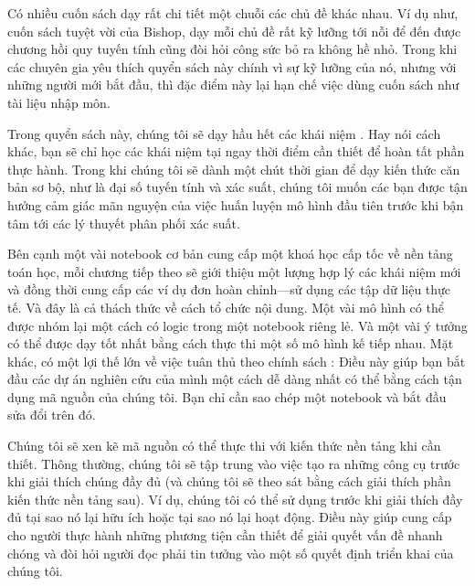 \documentclass[letterpaper,11pt,english]{sphinxmanual}
\begin{document}
Có nhiều cuốn sách dạy rất chi tiết một chuỗi các chủ đề khác nhau. Ví
dụ như, cuốn sách tuyệt vời  của Bishop, dạy mỗi
chủ đề rất kỹ lưỡng tới nỗi để đến được chương hồi quy tuyến tính cũng
đòi hỏi công sức bỏ ra không hề nhỏ. Trong khi các chuyên gia yêu thích
quyển sách này chính vì sự kỹ lưỡng của nó, nhưng với những người mới
bắt đầu, thì đặc điểm này lại hạn chế việc dùng cuốn sách như tài liệu
nhập môn.



Trong quyển sách này, chúng tôi sẽ dạy hầu hết các khái niệm . Hay nói cách khác, bạn sẽ chỉ học các khái niệm tại ngay thời điểm
cần thiết để hoàn tất phần thực hành. Trong khi chúng tôi sẽ dành một
chút thời gian để dạy kiến thức căn bản sơ bộ, như là đại số tuyến tính
và xác suất, chúng tôi muốn các bạn được tận hưởng cảm giác mãn nguyện
của việc huấn luyện mô hình đầu tiên trước khi bận tâm tới các lý thuyết
phân phối xác suất.



Bên cạnh một vài notebook cơ bản cung cấp một khoá học cấp tốc về nền
tảng toán học, mỗi chương tiếp theo sẽ giới thiệu một lượng hợp lý các
khái niệm mới và đồng thời cung cấp các ví dụ đơn hoàn chỉnh—sử dụng các
tập dữ liệu thực tế. Và đây là cả thách thức về cách tổ chức nội dung.
Một vài mô hình có thể được nhóm lại một cách có logic trong một
notebook riêng lẻ. Và một vài ý tưởng có thể được dạy tốt nhất bằng cách
thực thi một số mô hình kế tiếp nhau. Mặt khác, có một lợi thế lớn về
việc tuân thủ theo chính sách :
Điều này giúp bạn bắt đầu các dự án nghiên cứu của mình một cách dễ dàng
nhất có thể bằng cách tận dụng mã nguồn của chúng tôi. Bạn chỉ cần sao
chép một notebook và bắt đầu sửa đổi trên đó.



Chúng tôi sẽ xen kẽ mã nguồn có thể thực thi với kiến thức nền tảng khi
cần thiết. Thông thường, chúng tôi sẽ tập trung vào việc tạo ra những
công cụ trước khi giải thích chúng đầy đủ (và chúng tôi sẽ theo sát bằng
cách giải thích phần kiến thức nền tảng sau). Ví dụ, chúng tôi có thể sử
dụng  trước khi giải thích đầy đủ tại sao nó lại
hữu ích hoặc tại sao nó lại hoạt động. Điều này giúp cung cấp cho người
thực hành những phương tiện cần thiết để giải quyết vấn đề nhanh chóng
và đòi hỏi người đọc phải tin tưởng vào một số quyết định triển khai của
chúng tôi.
\end{document}
